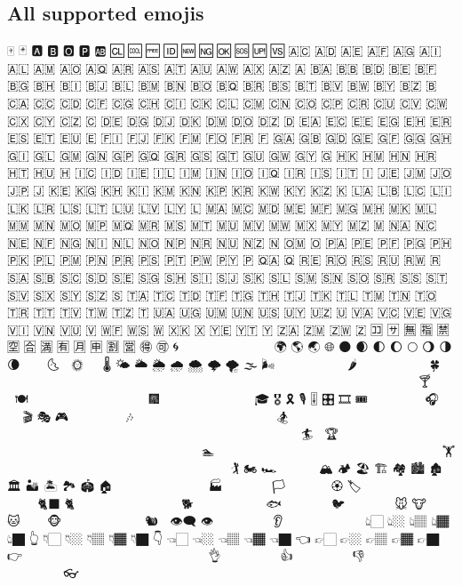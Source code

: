 \documentclass{article}
\begin{document}
\subsection*{All supported emojis}
🀄 🃏 🅰 🅱 🅾 🅿 🆎 🆑 🆒 🆓 🆔 🆕 🆖 🆗 🆘 🆙 🆚 🇦🇨 🇦🇩 🇦🇪 🇦🇫 🇦🇬 🇦🇮 🇦🇱 🇦🇲 🇦🇴 🇦🇶 🇦🇷 🇦🇸 🇦🇹 🇦🇺 🇦🇼 🇦🇽 🇦🇿 🇦 🇧🇦 🇧🇧 🇧🇩 🇧🇪 🇧🇫 🇧🇬 🇧🇭 🇧🇮 🇧🇯 🇧🇱 🇧🇲 🇧🇳 🇧🇴 🇧🇶 🇧🇷 🇧🇸 🇧🇹 🇧🇻 🇧🇼 🇧🇾 🇧🇿 🇧 🇨🇦 🇨🇨 🇨🇩 🇨🇫 🇨🇬 🇨🇭 🇨🇮 🇨🇰 🇨🇱 🇨🇲 🇨🇳 🇨🇴 🇨🇵 🇨🇷 🇨🇺 🇨🇻 🇨🇼 🇨🇽 🇨🇾 🇨🇿 🇨 🇩🇪 🇩🇬 🇩🇯 🇩🇰 🇩🇲 🇩🇴 🇩🇿 🇩 🇪🇦 🇪🇨 🇪🇪 🇪🇬 🇪🇭 🇪🇷 🇪🇸 🇪🇹 🇪🇺 🇪 🇫🇮 🇫🇯 🇫🇰 🇫🇲 🇫🇴 🇫🇷 🇫 🇬🇦 🇬🇧 🇬🇩 🇬🇪 🇬🇫 🇬🇬 🇬🇭 🇬🇮 🇬🇱 🇬🇲 🇬🇳 🇬🇵 🇬🇶 🇬🇷 🇬🇸 🇬🇹 🇬🇺 🇬🇼 🇬🇾 🇬 🇭🇰 🇭🇲 🇭🇳 🇭🇷 🇭🇹 🇭🇺 🇭 🇮🇨 🇮🇩 🇮🇪 🇮🇱 🇮🇲 🇮🇳 🇮🇴 🇮🇶 🇮🇷 🇮🇸 🇮🇹 🇮 🇯🇪 🇯🇲 🇯🇴 🇯🇵 🇯 🇰🇪 🇰🇬 🇰🇭 🇰🇮 🇰🇲 🇰🇳 🇰🇵 🇰🇷 🇰🇼 🇰🇾 🇰🇿 🇰 🇱🇦 🇱🇧 🇱🇨 🇱🇮 🇱🇰 🇱🇷 🇱🇸 🇱🇹 🇱🇺 🇱🇻 🇱🇾 🇱 🇲🇦 🇲🇨 🇲🇩 🇲🇪 🇲🇫 🇲🇬 🇲🇭 🇲🇰 🇲🇱 🇲🇲 🇲🇳 🇲🇴 🇲🇵 🇲🇶 🇲🇷 🇲🇸 🇲🇹 🇲🇺 🇲🇻 🇲🇼 🇲🇽 🇲🇾 🇲🇿 🇲 🇳🇦 🇳🇨 🇳🇪 🇳🇫 🇳🇬 🇳🇮 🇳🇱 🇳🇴 🇳🇵 🇳🇷 🇳🇺 🇳🇿 🇳 🇴🇲 🇴 🇵🇦 🇵🇪 🇵🇫 🇵🇬 🇵🇭 🇵🇰 🇵🇱 🇵🇲 🇵🇳 🇵🇷 🇵🇸 🇵🇹 🇵🇼 🇵🇾 🇵 🇶🇦 🇶 🇷🇪 🇷🇴 🇷🇸 🇷🇺 🇷🇼 🇷 🇸🇦 🇸🇧 🇸🇨 🇸🇩 🇸🇪 🇸🇬 🇸🇭 🇸🇮 🇸🇯 🇸🇰 🇸🇱 🇸🇲 🇸🇳 🇸🇴 🇸🇷 🇸🇸 🇸🇹 🇸🇻 🇸🇽 🇸🇾 🇸🇿 🇸 🇹🇦 🇹🇨 🇹🇩 🇹🇫 🇹🇬 🇹🇭 🇹🇯 🇹🇰 🇹🇱 🇹🇲 🇹🇳 🇹🇴 🇹🇷 🇹🇹 🇹🇻 🇹🇼 🇹🇿 🇹 🇺🇦 🇺🇬 🇺🇲 🇺🇳 🇺🇸 🇺🇾 🇺🇿 🇺 🇻🇦 🇻🇨 🇻🇪 🇻🇬 🇻🇮 🇻🇳 🇻🇺 🇻 🇼🇫 🇼🇸 🇼 🇽🇰 🇽 🇾🇪 🇾🇹 🇾 🇿🇦 🇿🇲 🇿🇼 🇿 🈁 🈂 🈚 🈯 🈲 🈳 🈴 🈵 🈶 🈷 🈸 🈹 🈺 🉐 🉑 🌀 🌁 🌂 🌃 🌄 🌅 🌆 🌇 🌈 🌉 🌊 🌋 🌌 🌍 🌎 🌏 🌐 🌑 🌒 🌓 🌔 🌕 🌖 🌗 🌘 🌙 🌚 🌛 🌜 🌝 🌞 🌟 🌠 🌡 🌤 🌥 🌦 🌧 🌨 🌩 🌪 🌫 🌬 🌭 🌮 🌯 🌰 🌱 🌲 🌳 🌴 🌵 🌶 🌷 🌸 🌹 🌺 🌻 🌼 🌽 🌾 🌿 🍀 🍁 🍂 🍃 🍄 🍅 🍆 🍇 🍈 🍉 🍊 🍋 🍌 🍍 🍎 🍏 🍐 🍑 🍒 🍓 🍔 🍕 🍖 🍗 🍘 🍙 🍚 🍛 🍜 🍝 🍞 🍟 🍠 🍡 🍢 🍣 🍤 🍥 🍦 🍧 🍨 🍩 🍪 🍫 🍬 🍭 🍮 🍯 🍰 🍱 🍲 🍳 🍴 🍵 🍶 🍷 🍸 🍹 🍺 🍻 🍼 🍽 🍾 🍿 🎀 🎁 🎂 🎃 🎄 🎅🏻 🎅🏼 🎅🏽 🎅🏾 🎅🏿 🎅 🎆 🎇 🎈 🎉 🎊 🎋 🎌 🎍 🎎 🎏 🎐 🎑 🎒 🎓 🎖 🎗 🎙 🎚 🎛 🎞 🎟 🎠 🎡 🎢 🎣 🎤 🎥 🎦 🎧 🎨 🎩 🎪 🎫 🎬 🎭 🎮 🎯 🎰 🎱 🎲 🎳 🎴 🎵 🎶 🎷 🎸 🎹 🎺 🎻 🎼 🎽 🎾 🎿 🏀 🏁 🏂🏻 🏂🏼 🏂🏽 🏂🏾 🏂🏿 🏂 🏃🏻‍♀️ 🏃🏻‍♂️ 🏃🏻 🏃🏼‍♀️ 🏃🏼‍♂️ 🏃🏼 🏃🏽‍♀️ 🏃🏽‍♂️ 🏃🏽 🏃🏾‍♀️ 🏃🏾‍♂️ 🏃🏾 🏃🏿‍♀️ 🏃🏿‍♂️ 🏃🏿 🏃‍♀️ 🏃‍♂️ 🏃 🏄🏻‍♀️ 🏄🏻‍♂️ 🏄🏻 🏄🏼‍♀️ 🏄🏼‍♂️ 🏄🏼 🏄🏽‍♀️ 🏄🏽‍♂️ 🏄🏽 🏄🏾‍♀️ 🏄🏾‍♂️ 🏄🏾 🏄🏿‍♀️ 🏄🏿‍♂️ 🏄🏿 🏄‍♀️ 🏄‍♂️ 🏄 🏅 🏆 🏇🏻 🏇🏼 🏇🏽 🏇🏾 🏇🏿 🏇 🏈 🏉 🏊🏻‍♀️ 🏊🏻‍♂️ 🏊🏻 🏊🏼‍♀️ 🏊🏼‍♂️ 🏊🏼 🏊🏽‍♀️ 🏊🏽‍♂️ 🏊🏽 🏊🏾‍♀️ 🏊🏾‍♂️ 🏊🏾 🏊🏿‍♀️ 🏊🏿‍♂️ 🏊🏿 🏊‍♀️ 🏊‍♂️ 🏊 🏋🏻‍♀️ 🏋🏻‍♂️ 🏋🏻 🏋🏼‍♀️ 🏋🏼‍♂️ 🏋🏼 🏋🏽‍♀️ 🏋🏽‍♂️ 🏋🏽 🏋🏾‍♀️ 🏋🏾‍♂️ 🏋🏾 🏋🏿‍♀️ 🏋🏿‍♂️ 🏋🏿 🏋️‍♀️ 🏋️‍♂️ 🏋 🏌🏻‍♀️ 🏌🏻‍♂️ 🏌🏻 🏌🏼‍♀️ 🏌🏼‍♂️ 🏌🏼 🏌🏽‍♀️ 🏌🏽‍♂️ 🏌🏽 🏌🏾‍♀️ 🏌🏾‍♂️ 🏌🏾 🏌🏿‍♀️ 🏌🏿‍♂️ 🏌🏿 🏌️‍♀️ 🏌️‍♂️ 🏌 🏍 🏎 🏏 🏐 🏑 🏒 🏓 🏔 🏕 🏖 🏗 🏘 🏙 🏚 🏛 🏜 🏝 🏞 🏟 🏠 🏡 🏢 🏣 🏤 🏥 🏦 🏧 🏨 🏩 🏪 🏫 🏬 🏭 🏮 🏯 🏰 🏳️‍🌈 🏳️‍⚧️ 🏳 🏴‍☠️ 🏴󠁧󠁢󠁥󠁮󠁧󠁿 🏴󠁧󠁢󠁳󠁣󠁴󠁿 🏴󠁧󠁢󠁷󠁬󠁳󠁿 🏴 🏵 🏷 🏸 🏹 🏺 🏻 🏼 🏽 🏾 🏿 🐀 🐁 🐂 🐃 🐄 🐅 🐆 🐇 🐈‍⬛ 🐈 🐉 🐊 🐋 🐌 🐍 🐎 🐏 🐐 🐑 🐒 🐓 🐔 🐕‍🦺 🐕 🐖 🐗 🐘 🐙 🐚 🐛 🐜 🐝 🐞 🐟 🐠 🐡 🐢 🐣 🐤 🐥 🐦 🐧 🐨 🐩 🐪 🐫 🐬 🐭 🐮 🐯 🐰 🐱 🐲 🐳 🐴 🐵 🐶 🐷 🐸 🐹 🐺 🐻‍❄️ 🐻 🐼 🐽 🐾 🐿 👀 👁‍🗨 👁 👂🏻 👂🏼 👂🏽 👂🏾 👂🏿 👂 👃🏻 👃🏼 👃🏽 👃🏾 👃🏿 👃 👄 👅 👆🏻 👆🏼 👆🏽 👆🏾 👆🏿 👆 👇🏻 👇🏼 👇🏽 👇🏾 👇🏿 👇 👈🏻 👈🏼 👈🏽 👈🏾 👈🏿 👈 👉🏻 👉🏼 👉🏽 👉🏾 👉🏿 👉 👊🏻 👊🏼 👊🏽 👊🏾 👊🏿 👊 👋🏻 👋🏼 👋🏽 👋🏾 👋🏿 👋 👌🏻 👌🏼 👌🏽 👌🏾 👌🏿 👌 👍🏻 👍🏼 👍🏽 👍🏾 👍🏿 👍 👎🏻 👎🏼 👎🏽 👎🏾 👎🏿 👎 👏🏻 👏🏼 👏🏽 👏🏾 👏🏿 👏 👐🏻 👐🏼 👐🏽 👐🏾 👐🏿 👐 👑 👒 👓 👔 👕 👖 👗 👘 👙 👚 👛 👜 👝 👞 👟 👠 👡 👢 👣 👤 👥 👦🏻 👦🏼 👦🏽 👦🏾 👦🏿 👦 👧🏻 👧🏼 👧🏽 👧🏾 👧🏿 👧 👨🏻‍🌾 👨🏻‍🍳 👨🏻‍🍼 👨🏻‍🎄 👨🏻‍🎓 👨🏻‍🎤 👨🏻‍🎨 👨🏻‍🏫 👨🏻‍🏭 👨🏻‍💻 👨🏻‍💼 👨🏻‍🔧 👨🏻‍🔬 👨🏻‍🚀 👨🏻‍🚒 👨🏻‍🤝‍👨🏼 👨🏻‍🤝‍👨🏽 👨🏻‍🤝‍👨🏾 👨🏻‍🤝‍👨🏿 👨🏻‍🦯 👨🏻‍🦰 👨🏻‍🦱 👨🏻‍🦲 👨🏻‍🦳 👨🏻‍🦼 👨🏻‍🦽 👨🏻‍⚕️ 👨🏻‍⚖️ 👨🏻‍✈️ 👨🏻‍❤️‍👨🏻 👨🏻‍❤️‍👨🏼 👨🏻‍❤️‍👨🏽 👨🏻‍❤️‍👨🏾 👨🏻‍❤️‍👨🏿 👨🏻‍❤️‍💋‍👨🏻 👨🏻‍❤️‍💋‍👨🏼 👨🏻‍❤️‍💋‍👨🏽 👨🏻‍❤️‍💋‍👨🏾 👨🏻‍❤️‍💋‍👨🏿 👨🏻 👨🏼‍🌾 👨🏼‍🍳 👨🏼‍🍼 👨🏼‍🎄 👨🏼‍🎓 👨🏼‍🎤 👨🏼‍🎨 👨🏼‍🏫 👨🏼‍🏭 👨🏼‍💻 👨🏼‍💼 👨🏼‍🔧 👨🏼‍🔬 👨🏼‍🚀 👨🏼‍🚒 👨🏼‍🤝‍👨🏻 👨🏼‍🤝‍👨🏽 👨🏼‍🤝‍👨🏾 👨🏼‍🤝‍👨🏿 👨🏼‍🦯 👨🏼‍🦰 👨🏼‍🦱 👨🏼‍🦲 👨🏼‍🦳 👨🏼‍🦼 👨🏼‍🦽 👨🏼‍⚕️ 👨🏼‍⚖️ 👨🏼‍✈️ 👨🏼‍❤️‍👨🏻 👨🏼‍❤️‍👨🏼 👨🏼‍❤️‍👨🏽 👨🏼‍❤️‍👨🏾 👨🏼‍❤️‍👨🏿 👨🏼‍❤️‍💋‍👨🏻 👨🏼‍❤️‍💋‍👨🏼 👨🏼‍❤️‍💋‍👨🏽 👨🏼‍❤️‍💋‍👨🏾 👨🏼‍❤️‍💋‍👨🏿 👨🏼 👨🏽‍🌾 👨🏽‍🍳 👨🏽‍🍼 👨🏽‍🎄 👨🏽‍🎓 👨🏽‍🎤 👨🏽‍🎨 👨🏽‍🏫 👨🏽‍🏭 👨🏽‍💻 👨🏽‍💼 👨🏽‍🔧 👨🏽‍🔬 👨🏽‍🚀 👨🏽‍🚒 👨🏽‍🤝‍👨🏻 👨🏽‍🤝‍👨🏼 👨🏽‍🤝‍👨🏾 👨🏽‍🤝‍👨🏿 👨🏽‍🦯 👨🏽‍🦰 👨🏽‍🦱 👨🏽‍🦲 👨🏽‍🦳 👨🏽‍🦼 👨🏽‍🦽 👨🏽‍⚕️ 👨🏽‍⚖️ 👨🏽‍✈️ 👨🏽‍❤️‍👨🏻 👨🏽‍❤️‍👨🏼 👨🏽‍❤️‍👨🏽 👨🏽‍❤️‍👨🏾 👨🏽‍❤️‍👨🏿 👨🏽‍❤️‍💋‍👨🏻 
\end{document}
